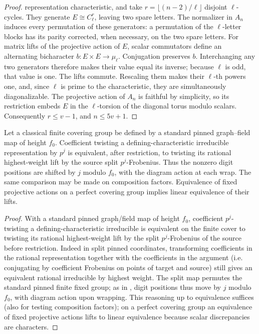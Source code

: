 \begin{proof}
representation characteristic, and take \(r=\lfloor(n-2)/\ell\rfloor\)
disjoint \(\ell\)-cycles.  They generate \(E\cong C_\ell^r\), leaving
two spare letters.  The normalizer in \(A_n\) induces every permutation
of these generators: a permutation of the \(\ell\)-letter blocks has
its parity corrected, when necessary, on the two spare letters.
For matrix lifts of the projective action of \(E\), scalar commutators
define an alternating bicharacter \(b:E\times E\to\mu_\ell\).
Conjugation preserves \(b\).  Interchanging any two generators therefore
makes their value equal its inverse; because \(\ell\) is odd, that
value is one.  The lifts commute.  Rescaling them makes their
\(\ell\)-th powers one, and, since \(\ell\) is prime to the
characteristic, they are simultaneously diagonalizable.
The projective action of \(A_n\) is faithful by simplicity, so its
restriction embeds \(E\) in the \(\ell\)-torsion of the diagonal torus
modulo scalars.  Consequently \(r\le v-1\), and \(n\le5v+1\).

\end{proof}

\begin{lemma}\label{fa:coefficient-twists}
Let a classical finite covering group be defined by a standard pinned graph--field map of height \(f_0\).
Coefficient twisting a defining-characteristic irreducible representation by \(p^j\) is equivalent, after
restriction, to twisting its rational highest-weight lift by the source split \(p^j\)-Frobenius.  Thus
the nonzero digit positions are shifted by \(j\) modulo \(f_0\), with the diagram action at each wrap.
The same comparison may be made on composition factors.  Equivalence of fixed projective actions on a
perfect covering group implies linear equivalence of their lifts.
\end{lemma}

\begin{proof}

With a standard pinned graph/field map of height \(f_0\), coefficient \(p^j\)-twisting a
defining-characteristic irreducible is equivalent on the finite cover to twisting its rational
highest-weight lift by the split \(p^j\)-Frobenius of the source before restriction. Indeed in split
pinned coordinates, transforming coefficients in the rational representation together with the
coefficients in the argument (i.e. conjugating by coefficient Frobenius on points of target and source)
still gives an equivalent rational irreducible by highest weight. The split map permutes the standard
pinned finite fixed group; as in , digit positions thus move by \(j\) modulo \(f_0\), with
diagram action upon wrapping. This reasoning up to equivalence suffices (also for testing composition
factors); on a perfect covering group an equivalence of fixed projective actions lifts to linear
equivalence because scalar discrepancies are characters.

\end{proof}


